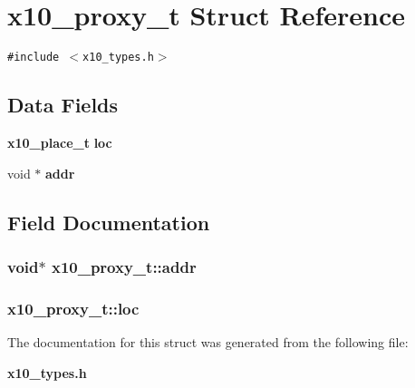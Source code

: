 \section{x10\_\-proxy\_\-t Struct Reference}
\label{structx10__proxy__t}
{\tt \#include $<$x10\_\-types.h$>$}

\subsection*{Data Fields}
\begin{CompactItemize}
\item 
{\bf x10\_\-place\_\-t} {\bf loc}
\item 
void $\ast$ {\bf addr}
\end{CompactItemize}


\subsection{Field Documentation}
\subsubsection{\setlength{\rightskip}{0pt plus 5cm}void$\ast$ {\bf x10\_\-proxy\_\-t::addr}}\label{structx10__proxy__t_o1}


\subsubsection{ {\bf x10\_\-proxy\_\-t::loc}}\label{structx10__proxy__t_o0}




The documentation for this struct was generated from the following file:\begin{CompactItemize}
\item 
{\bf x10\_\-types.h}\end{CompactItemize}

